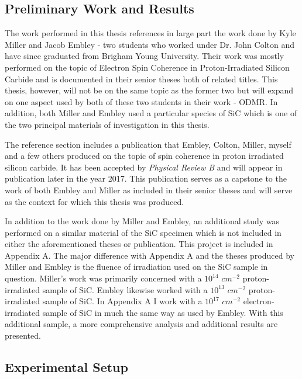 \documentclass[oneside, astronomy, noacknowlegments]{BYUPhys}
\begin{document}
\subsection{Preliminary Work and Results}

The work performed in this thesis references in large part the work done by Kyle Miller and Jacob Embley - two students who worked under Dr. John Colton and have since graduated from Brigham Young University. Their work was mostly performed on the topic of Electron Spin Coherence in Proton-Irradiated Silicon Carbide and is documented in their senior theses both of related titles. This thesis, however, will not be on the same topic as the former two but will expand on one aspect used by both of these two students in their work - ODMR. In addition, both Miller and Embley used a particular species of SiC which is one of the two principal materials of investigation in this thesis.

The reference section includes a publication that Embley, Colton, Miller, myself and a few others produced on the topic of spin coherence in proton irradiated silicon carbide. It has been accepted by \textit{Physical Review B} and will appear in publication later in the year 2017. This publication serves as a capstone to the work of both Embley and Miller as included in their senior theses and will serve as the context for which this thesis was produced.

In addition to the work done by Miller and Embley, an additional study was performed on a similar material of the SiC specimen which is not included in either the aforementioned theses or publication. This project is included in Appendix A. The major difference with Appendix A and the theses produced by Miller and Embley is the fluence of irradiation used on the SiC sample in question. Miller's work was primarily concerned with a $10^{14}$ $cm^{-2}$ proton-irradiated sample of SiC. Embley likewise worked with a $10^{13}$ $cm^{-2}$ proton-irradiated sample of SiC. In Appendix A I work with a $10^{17}$ $cm^{-2}$ electron-irradiated sample of SiC in much the same way as used by Embley. With this additional sample, a more comprehensive analysis and additional results are presented.

\subsection{Experimental Setup}
\end{document}
